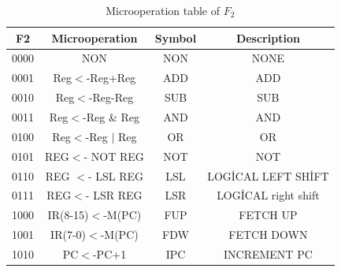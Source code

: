 \documentclass[pdftex,12pt,a4paper]{article}
\begin{document}
\begin{table}[H]
    \centering
    \begin{tabular}{|c|c c c|}
    \hline
    F2 & Microoperation  & Symbol & Description \\ \hline
    0000 &    NON			   &       NON    &         	NONE                 \\
    0001 &    Reg$<$-Reg+Reg	 &         ADD	        &     ADD               \\
    0010 &    Reg$<$-Reg-Reg	 &         SUB	     &       SUB         \\
    0011 &    Reg$<$-Reg \& Reg    &      AND	 &             AND               \\
    0100 &    Reg$<$-Reg $|$ Reg  &        OR	     &       OR                         \\
    0101 &    REG$<$- NOT REG    &       NOT	   &         NOT	        \\
    0110 &    REG $<$- LSL REG	   &   LSL	    &        LOGİCAL LEFT SHİFT	        \\
    0111 &    REG$<$-  LSR REG	   &   LSR	    &        LOGİCAL right shift        \\
    1000 &    IR(8-15)$<$-M(PC)	   &   FUP	       &     FETCH UP         \\
    1001 &    IR(7-0)$<$-M(PC)	&      FDW	  &          FETCH DOWN          \\
    1010 &    PC$<$-PC+1		   &       IPC	 &           INCREMENT PC	             \\ \hline
    \end{tabular}
    \caption{Microoperation table of $F_2$}
    \label{mp f2}
\end{table}
\end{document}
